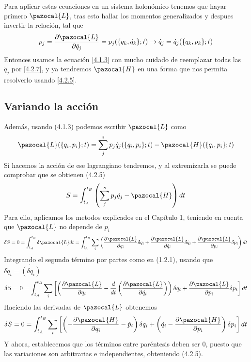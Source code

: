 Para aplicar estas ecuaciones en un sistema holonómico tenemos que hayar primero $\pazocal{L}$, tras esto hallar los momentos generalizados y despues invertir la relación, tal que
\begin{equation} \label{4.2.7}
    p_j = \frac{\partial \pazocal{L}}{\partial \dot{q}_j}=p_j(\{q_k,\dot{q}_k\};t) \rightarrow \dot{q}_j = \dot{q}_j(\{q_k,p_k\};t)
\end{equation} 
Entonces usamos la ecuación \eqref{4.1.3} con mucho cuidado de reemplazar todas las $\dot{q}_j$ por \eqref{4.2.7}, y ya tendremos $\pazocal{H}$ en una forma que nos permita resolverlo usando \eqref{4.2.5}.
\newpage
\subsection{Variando la acción}
Además, usando (4.1.3) podemos escribir $\pazocal{L}$ como
\begin{equation} \label{4.2.8}
    \pazocal{L}(\{q_i,p_i\};t) = \sum_j^s p_j \dot{q}_j (\{q_i,p_i\};t) -\pazocal{H}(\{q_i,p_i\};t)
\end{equation} 
Si hacemos la acción de ese lagrangiano tendremos, y al extremizarla se puede comprobar que se obtienen (4.2.5)
\begin{equation} \label{4.2.9}
    S = \int_{t_A}^{t_B} \left(\sum_j^s p_j \dot{q}_j -\pazocal{H}\right) dt
\end{equation} 
Para ello, aplicamos los metodos explicados en el Capítulo 1, teniendo en cuenta que $\pazocal{L}$ no depende de $\dot{p}_i$ 
\[
    \delta S = 0 = \int_{t_A}^{t_B} \delta \pazocal{L} dt = \int_{t_A}^{t_B} \sum_i\left(\frac{\partial \pazocal{L}}{\partial q_i} \delta q_i + \frac{\partial \pazocal{L}}{\partial \dot{q}_i} \delta \dot{q}_i + \frac{\partial \pazocal{L}}{\partial p_i} \delta p_i\right) dt
\]
Integrando el segundo término por partes como en (1.2.1), usando que $\delta \dot{q}_i =  \dot{(\delta q_i)}$
\[
    \delta S = 0 = \int_{t_A}^{t_B} \sum_{i}\left[\left(\frac{\partial \pazocal{L}}{\partial q_i} - \frac{d}{dt}\left(\frac{\partial \pazocal{L}}{\partial \dot{q}_i}\right)\right) \delta q_i + \frac{\partial \pazocal{L}}{\partial p_i}\delta p_i\right] dt
\]
Haciendo las derivadas de $\pazocal{L}$ obtenemos
\begin{equation} \label{4.2.10}
    \delta S = 0 = \int_{t_A}^{t_B} \sum_{i}\left[\left(-\frac{\partial \pazocal{H}}{\partial q_i} - \dot{p}_i\right) \delta q_i + \left(\dot{q}_i-\frac{\partial \pazocal{H}}{\partial p_i}\right)\delta p_i\right] dt
\end{equation} 
Y ahora, establecemos que los términos entre paréntesis deben ser 0, puesto que las variaciones son arbitrarias e independientes, obteniendo (4.2.5).
\vspace{-20pt}

